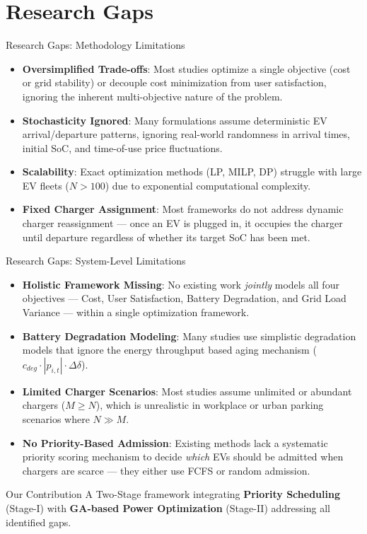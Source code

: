\documentclass{beamer}
\begin{document}
\section{Research Gaps}
\begin{frame}{Research Gaps: Methodology Limitations}
  \begin{itemize}
    \item \textbf{Oversimplified Trade-offs}: Most studies optimize a single objective (cost or grid stability) or decouple cost minimization from user satisfaction, ignoring the inherent multi-objective nature of the problem.
    \item \textbf{Stochasticity Ignored}: Many formulations assume deterministic EV arrival/departure patterns, ignoring real-world randomness in arrival times, initial SoC, and time-of-use price fluctuations.
    \item \textbf{Scalability}: Exact optimization methods (LP, MILP, DP) struggle with large EV fleets ($N > 100$) due to exponential computational complexity.
    \item \textbf{Fixed Charger Assignment}: Most frameworks do not address dynamic charger reassignment --- once an EV is plugged in, it occupies the charger until departure regardless of whether its target SoC has been met.
  \end{itemize}
\end{frame}

\begin{frame}{Research Gaps: System-Level Limitations}
  \begin{itemize}
    \item \textbf{Holistic Framework Missing}: No existing work \textit{jointly} models all four objectives --- Cost, User Satisfaction, Battery Degradation, and Grid Load Variance --- within a single optimization framework.
    \item \textbf{Battery Degradation Modeling}: Many studies use simplistic degradation models that ignore the energy throughput based aging mechanism ($c_{deg} \cdot |p_{i,t}| \cdot \Delta\delta$).
    \item \textbf{Limited Charger Scenarios}: Most studies assume unlimited or abundant chargers ($M \geq N$), which is unrealistic in workplace or urban parking scenarios where $N \gg M$.
    \item \textbf{No Priority-Based Admission}: Existing methods lack a systematic priority scoring mechanism to decide \textit{which} EVs should be admitted when chargers are scarce --- they either use FCFS or random admission.
  \end{itemize}
  \vspace{0.3cm}
  \begin{block}{Our Contribution}
  A Two-Stage framework integrating \textbf{Priority Scheduling} (Stage-I) with \textbf{GA-based Power Optimization} (Stage-II) addressing all identified gaps.
  \end{block}
\end{frame}
\end{document}

